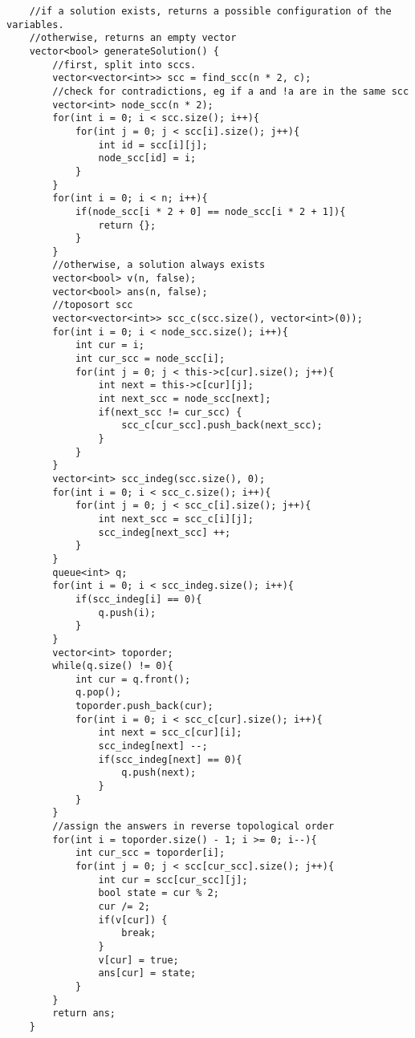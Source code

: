 \documentclass[8pt, headheight=10pt]{scrartcl}
\begin{document}
\begin{multicols*}{3}
\begin{lstlisting}
    //if a solution exists, returns a possible configuration of the variables. 
    //otherwise, returns an empty vector
    vector<bool> generateSolution() {
        //first, split into sccs. 
        vector<vector<int>> scc = find_scc(n * 2, c);
        //check for contradictions, eg if a and !a are in the same scc
        vector<int> node_scc(n * 2);
        for(int i = 0; i < scc.size(); i++){
            for(int j = 0; j < scc[i].size(); j++){
                int id = scc[i][j];
                node_scc[id] = i;
            }
        }
        for(int i = 0; i < n; i++){
            if(node_scc[i * 2 + 0] == node_scc[i * 2 + 1]){
                return {};
            }
        }
        //otherwise, a solution always exists
        vector<bool> v(n, false);
        vector<bool> ans(n, false);
        //toposort scc
        vector<vector<int>> scc_c(scc.size(), vector<int>(0));
        for(int i = 0; i < node_scc.size(); i++){
            int cur = i;
            int cur_scc = node_scc[i];
            for(int j = 0; j < this->c[cur].size(); j++){
                int next = this->c[cur][j];
                int next_scc = node_scc[next];
                if(next_scc != cur_scc) {
                    scc_c[cur_scc].push_back(next_scc);
                }
            }
        }
        vector<int> scc_indeg(scc.size(), 0);
        for(int i = 0; i < scc_c.size(); i++){
            for(int j = 0; j < scc_c[i].size(); j++){
                int next_scc = scc_c[i][j];
                scc_indeg[next_scc] ++;
            }
        }
        queue<int> q;
        for(int i = 0; i < scc_indeg.size(); i++){
            if(scc_indeg[i] == 0){
                q.push(i);
            }
        }
        vector<int> toporder;
        while(q.size() != 0){
            int cur = q.front();
            q.pop();
            toporder.push_back(cur);
            for(int i = 0; i < scc_c[cur].size(); i++){
                int next = scc_c[cur][i];
                scc_indeg[next] --;
                if(scc_indeg[next] == 0){
                    q.push(next);
                }
            }
        }
        //assign the answers in reverse topological order
        for(int i = toporder.size() - 1; i >= 0; i--){
            int cur_scc = toporder[i];
            for(int j = 0; j < scc[cur_scc].size(); j++){
                int cur = scc[cur_scc][j];
                bool state = cur % 2;
                cur /= 2;
                if(v[cur]) {
                    break;
                }
                v[cur] = true;
                ans[cur] = state;
            }
        }
        return ans;
    }


\end{lstlisting}
\end{multicols*}
\end{document}
